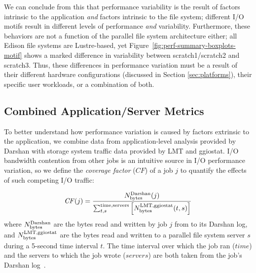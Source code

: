 We can conclude from this that performance variability is the result of factors intrinsic to the application \emph{and} factors intrinsic to the file system;
different I/O motifs result in different levels of performance \emph{and} variability.
Furthermore, these behaviors are not a function of the parallel file system architecture either; all Edison file systems are Lustre-based, yet Figure~\ref{fig:perf-summary-boxplots-motif} shows a marked difference in variability between scratch1/scratch2 and scratch3.
Thus, these differences in performance variation must be a result of their different hardware configurations (discussed in Section \ref{sec:platforms}), their specific user workloads, or a combination of both.

\subsection{Combined Application/Server Metrics} \label{sec:results/combining}

To better understand how performance variation is caused by factors extrinsic to the application, we combine data from application-level analysis provided by Darshan with storage system traffic data provided by LMT and ggiostat.
I/O bandwidth contention from other jobs is an intuitive source in I/O performance variation, so we define the \emph{coverage factor} ($\mathit{CF}$) of a job $j$ to quantify the effects of such competing I/O traffic:

\begin{equation} \label{eq:cf}
    \mathit{CF}(j) = \frac{N_{\textup{bytes}}^{\textup{Darshan}}(j)}
    {\sum_{t,s}^{\textup{time,servers}}
    \left [ N_{\textup{bytes}}^{\textup{LMT,ggiostat}}(t,s) \right ] }
\end{equation}
%
where $N_{\textup{bytes}}^{\textup{Darshan}}$ are the bytes read and written by job $j$ from to its Darshan log, and $N_{\textup{bytes}}^{\textup{LMT,ggiostat}}$ are the bytes read and written to a parallel file system server $s$ during a 5-second time interval $t$.
The time interval over which the job ran ($\mathit{time}$) and the servers to which the job wrote ($\mathit{servers}$) are both taken from the job's Darshan log~\cite{snyder2016modular}.

